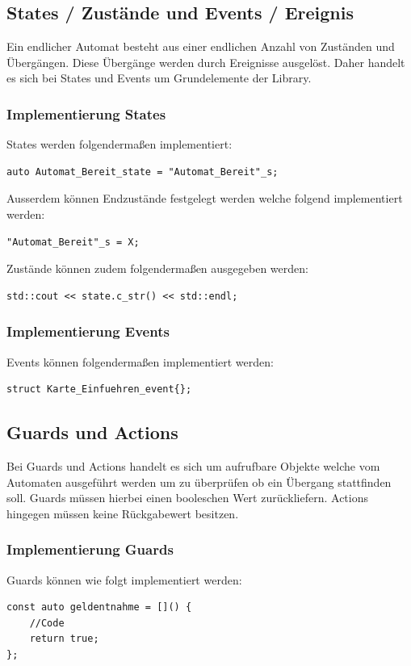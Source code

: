 \documentclass{report}
\begin{document}
\subsection{States / Zustände und Events / Ereignis}
Ein endlicher Automat besteht aus einer endlichen Anzahl von Zuständen und Übergängen. Diese Übergänge werden durch Ereignisse ausgelöst. Daher handelt es sich bei States und Events um Grundelemente der Library. 

\subsubsection{Implementierung States}
States werden folgendermaßen implementiert: 
\begin{lstlisting}
auto Automat_Bereit_state = "Automat_Bereit"_s;
\end{lstlisting}
Ausserdem können Endzustände festgelegt werden welche folgend implementiert werden:
\begin{lstlisting}
"Automat_Bereit"_s = X;
\end{lstlisting}
Zustände können zudem folgendermaßen ausgegeben werden:
\begin{lstlisting}
std::cout << state.c_str() << std::endl;
\end{lstlisting}

\subsubsection{Implementierung Events}
Events können folgendermaßen implementiert werden:
\begin{lstlisting}
struct Karte_Einfuehren_event{};
\end{lstlisting}

\subsection{Guards und Actions}
Bei Guards und Actions handelt es sich um aufrufbare Objekte welche vom Automaten ausgeführt werden um zu überprüfen ob ein Übergang stattfinden soll. Guards müssen hierbei einen booleschen Wert zurückliefern. Actions hingegen müssen keine Rückgabewert besitzen.

\subsubsection{Implementierung Guards}
Guards können wie folgt implementiert werden:
\begin{lstlisting}
const auto geldentnahme = []() {
    //Code
    return true;
};
\end{lstlisting}
\end{document}
